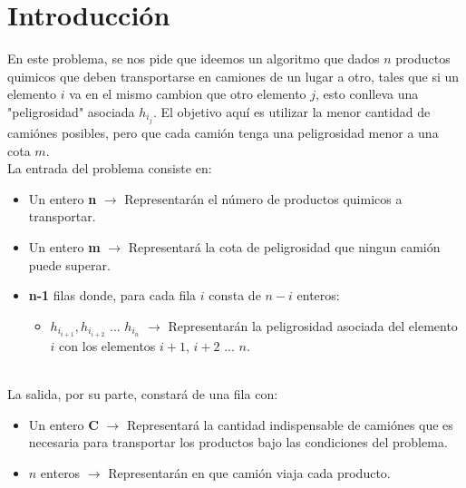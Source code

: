 \section{Introducci\'on}
En este problema, se nos pide que ideemos un algoritmo que dados $n$ productos quimicos que deben transportarse en camiones de un lugar a otro, tales que si un elemento $i$ va en el mismo cambion que otro elemento $j$, esto conlleva una "peligrosidad" asociada $h_i_j$. El objetivo aqu\'i es utilizar la menor cantidad de cami\'ones posibles, pero que cada cami\'on tenga una peligrosidad menor a una cota $m$.
\\
La entrada del problema consiste en:
\\
\begin{itemize}
\item Un entero \textbf{n} $\rightarrow$ Representar\'an el n\'umero de productos quimicos a transportar.
\item Un entero \textbf{m} $\rightarrow$ Representar\'a la cota de peligrosidad que ningun cami\'on puede superar.
\item \textbf{n-1} filas donde, para cada fila $i$ consta de $n-i$ enteros:
\begin{itemize}
\item $h_i_{i+1}, h_i_{i+2}$ ... $h_i_{n}$ $\rightarrow$ Representar\'an la peligrosidad asociada del elemento $i$ con los elementos $i+1$, $i+2$ ... $n$.
\end{itemize}
\end{itemize}
\\
La salida, por su parte, constar\'a de una fila con:
\\
\begin{itemize}
\item Un entero \textbf{C} $\rightarrow$ Representar\'a la cantidad indispensable de cami\'ones que es necesaria para transportar los productos bajo las condiciones del problema.
\item $n$ enteros $\rightarrow$ Representar\'an en que cami\'on viaja cada producto.
\end{itemize}

